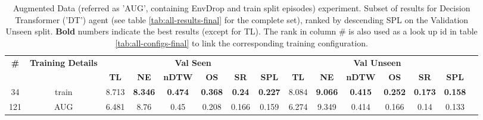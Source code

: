 \begin{table}
\centering
\caption{\label{tab:dt_env_drop}Augmented Data (referred as 'AUG', containing EnvDrop and train split episodes) experiment. Subset of results for Decision Transformer ('DT') agent (see table \ref{tab:all-results-final} for the complete set), ranked by descending SPL on the Validation Unseen split. \textbf{Bold} numbers indicate the best results (except for TL). The rank in column \# is also used as a look up id in table \ref{tab:all-configs-final} to link the corresponding training configuration.}
\begin{tabular}{@{\hskip3pt}c@{\hskip3pt}c@{\hskip3pt}c@{\hskip3pt}c@{\hskip3pt}c@{\hskip3pt}c@{\hskip3pt}c@{\hskip3pt}c@{\hskip3pt}c@{\hskip3pt}c@{\hskip3pt}c@{\hskip3pt}c@{\hskip3pt}c@{\hskip3pt}c@{\hskip3pt}c}
\toprule
                                  \textbf{\#} & \textbf{Training Details} & \multicolumn{6}{c}{\textbf{Val Seen}} & \multicolumn{6}{c}{\textbf{Val Unseen}} \\
\cmidrule(l){3-8}\cmidrule(l){9-14}\textbf{~} &                \textbf{~} &       \textbf{TL} &     \textbf{NE} &   \textbf{nDTW} &     \textbf{OS} &    \textbf{SR} &    \textbf{SPL} &         \textbf{TL} &     \textbf{NE} &   \textbf{nDTW} &     \textbf{OS} &     \textbf{SR} &    \textbf{SPL} \\
\midrule
                                           34 &                     train &             8.713 &  \textbf{8.346} &  \textbf{0.474} &  \textbf{0.368} &  \textbf{0.24} &  \textbf{0.227} &               8.084 &  \textbf{9.066} &  \textbf{0.415} &  \textbf{0.252} &  \textbf{0.173} &  \textbf{0.158} \\
                                          121 &                       AUG &             6.481 &            8.76 &            0.45 &           0.208 &          0.166 &           0.159 &               6.274 &           9.349 &           0.414 &           0.166 &            0.14 &           0.133 \\
\bottomrule
\end{tabular}
\end{table}
